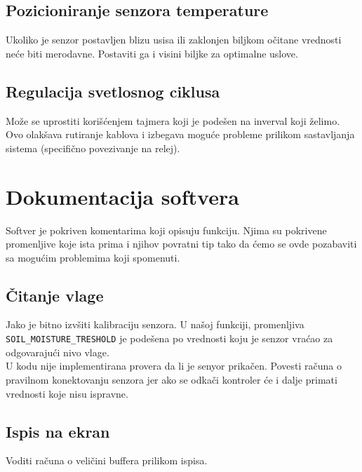 \documentclass[a4paper,11pt]{book}
\begin{document}
\subsection{Pozicioniranje senzora temperature}

Ukoliko je senzor postavljen blizu usisa ili zaklonjen biljkom očitane vrednosti neće biti merodavne. Postaviti ga i visini biljke za optimalne uslove.

\subsection{Regulacija svetlosnog ciklusa}

Može se uprostiti korišćenjem tajmera koji je podešen na inverval koji želimo. Ovo olakšava rutiranje kablova i izbegava moguće probleme prilikom sastavljanja sistema (specifično povezivanje na relej).


\section{Dokumentacija softvera}

Softver je pokriven komentarima koji opisuju funkciju. Njima su pokrivene promenljive koje ista prima i njihov povratni tip tako da ćemo se ovde pozabaviti sa mogućim problemima koji spomenuti.

\subsection{Čitanje vlage}

Jako je bitno izvšiti kalibraciju senzora. U našoj funkciji, promenljiva \lstinline{SOIL_MOISTURE_TRESHOLD} je podešena po vrednosti koju je senzor vraćao za odgovarajući nivo vlage.\\

U kodu nije implementirana provera da li je senyor prikačen. Povesti računa o pravilnom konektovanju senzora jer ako se odkači kontroler će i dalje primati vrednosti koje nisu ispravne.

\subsection{Ispis na ekran}

Voditi računa o veličini buffera prilikom ispisa.
\end{document}
